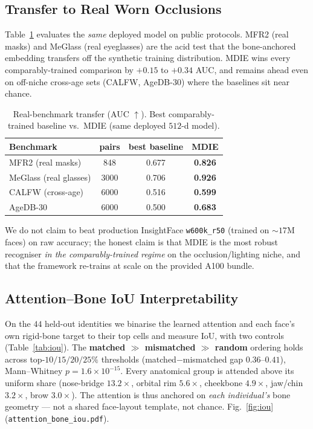 \documentclass[10pt,conference]{IEEEtran}
\begin{document}
\subsection{Transfer to Real Worn Occlusions}
Table~\ref{tab:real} evaluates the \emph{same} deployed model on public
protocols. MFR2 (real masks) and MeGlass (real eyeglasses) are the acid test
that the bone-anchored embedding transfers off the synthetic training
distribution. MDIE wins every comparably-trained comparison by $+0.15$ to
$+0.34$ AUC, and remains ahead even on off-niche cross-age sets (CALFW,
AgeDB-30) where the baselines sit near chance.

\begin{table}[t]
\centering
\caption{Real-benchmark transfer (AUC $\uparrow$). Best comparably-trained
baseline vs.\ MDIE (same deployed $512$-d model).}
\label{tab:real}
\begin{tabular}{lccc}
\toprule
Benchmark & pairs & best baseline & \textbf{MDIE} \\
\midrule
MFR2 (real masks)    & 848   & 0.677 & \textbf{0.826} \\
MeGlass (real glasses)& 3000  & 0.706 & \textbf{0.926} \\
CALFW (cross-age)    & 6000  & 0.516 & \textbf{0.599} \\
AgeDB-30             & 6000  & 0.500 & \textbf{0.683} \\
\bottomrule
\end{tabular}
\end{table}

We do not claim to beat production InsightFace \texttt{w600k\_r50} (trained on
$\sim\!17$M faces) on raw accuracy; the honest claim is that MDIE is the most
robust recogniser \emph{in the comparably-trained regime} on the
occlusion/lighting niche, and that the framework re-trains at scale on the
provided A100 bundle.

\subsection{Attention--Bone IoU Interpretability}
\label{sec:interp}
On the $44$ held-out identities we binarise the learned attention and each
face's own rigid-bone target to their top cells and measure IoU, with two
controls (Table~\ref{tab:iou}). The \textbf{matched $\gg$ mismatched $\gg$
random} ordering holds across top-$10/15/20/25\%$ thresholds (matched$-$mismatched
gap $0.36$--$0.41$), Mann--Whitney $p\!=\!1.6\!\times\!10^{-15}$. Every
anatomical group is attended above its uniform share (nose-bridge $13.2\times$,
orbital rim $5.6\times$, cheekbone $4.9\times$, jaw/chin $3.2\times$, brow
$3.0\times$). The attention is thus anchored on \emph{each individual's} bone
geometry --- not a shared face-layout template, not chance.
Fig.~\ref{fig:iou} (\texttt{attention\_bone\_iou.pdf}).
\end{document}
